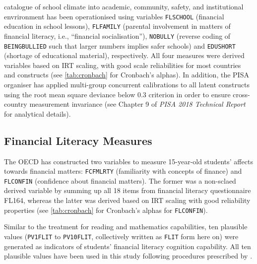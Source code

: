 \documentclass[a4paper,11pt,UKenglish,twoside,openright]{report}\usepackage[]{graphicx}\usepackage[]{color}
\begin{document}
 catalogue of school climate into academic, community, safety, and institutional envrironment has been operationised using variables \texttt{FLSCHOOL} (financial education in school lessons), \texttt{FLFAMILY} (parental involvement in matters of financial literacy, i.e., ``financial socialisation''), \texttt{NOBULLY} (reverse coding of \texttt{BEINGBULLIED} such that larger numbers implies safer schools) and \texttt{EDUSHORT} (shortage of educational material), respectively. All four measures were derived variables based on IRT scaling, with good scale reliabilities for most countries and constructs (see \cref{tab:cronbach} for Cronbach's alphas). In addition, the PISA organiser has applied multi-group concurrent calibrations to all latent constructs using the root mean square deviance below $0.3$ criterion \parencite[for a technical discussion on RMSD, see][p. 244]{buchholz:2019} in order to ensure cross-country measurement invariance (see Chapter 9 of \textit{PISA 2018 Technical Report} \parencite[][pp. 14--15]{PISAtech} for analytical details).



\subsection{Financial Literacy Measures}

The OECD has constructed two variables to measure 15-year-old students' affects towards financial matters: \texttt{FCFMLRTY} (familiarity with concepts of finance) and \texttt{FLCONFIN} (confidence about financial matters). The former was a non-sclaed derived variable by summing up all 18 items from financial literacy questionnaire \textsf{FL164}, whereas the latter was derived based on IRT scaling with good reliability properties (see \cref{tab:cronbach} for Cronbach's alphas for \texttt{FLCONFIN}).

Similar to the treatment for reading and mathematics capabilities, ten plausible values (\texttt{PV1FLIT} to \texttt{PV10FLIT}, collectively written as \texttt{FLIT} form here on) were generated as indicators of students' financial literacy cognition capability. %
All ten plausible values have been used in this study following procedures prescribed by \textcite{rubin:1987}.
\end{document}
